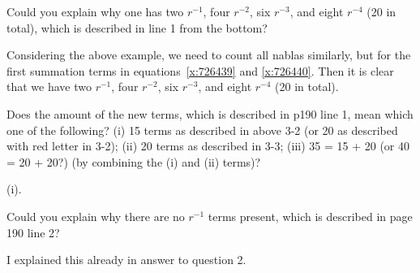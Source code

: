 \documentclass{exam}
\begin{document}
\begin{questions}
\begin{solution}
\end{solution} 

%
\question Could you explain why one has two $r^{-1}$, four $r^{-2}$, six $r^{-3}$, and eight $r^{-4}$ (20 in total), which is described in line 1 from the bottom?

\begin{solution}
Considering the above example, we need to count all nablas similarly, but for the first
summation terms in equations~\eqref{x:726439} and \eqref{x:726440}. Then it is clear that we have
two $r^{-1}$, four $r^{-2}$, six $r^{-3}$, and eight $r^{-4}$ (20 in total).
\end{solution} 

%
\question Does the amount of the new terms, which is described in p190 line 1, mean which one of the following? (i) 15 terms as described in above 3-2 (or 20 as described with red letter in 3-2);
(ii) 20 terms as described in 3-3; (iii) 35 = 15 + 20 (or 40 = 20 + 20?) (by combining the (i) and (ii) terms)?

\begin{solution}
(i).
\end{solution} 

%
\question Could you explain why there are no $r^{-1}$ terms present, which is described in page 190 line 2?

\begin{solution}
I explained this already in answer to question 2.
\end{solution} 
\end{questions}
\end{document}
